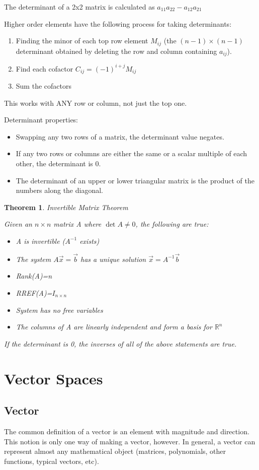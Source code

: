 \documentclass{article}
\newtheorem{theorem}{Theorem}
\begin{document}
The determinant of a 2x2 matrix is calculated as $a_{11}a_{22}-a_{12}a_{21}$

Higher order elements have the following process for taking determinants:
\begin{enumerate}
	\item Finding the minor of each top row element $M_{ij}$
		(the $(n-1)\times(n-1)$ determinant obtained by deleting the 
		row and column containing $a_{ij}$). 
	\item Find each cofactor $C_{ij}=(-1)^{i+j}M_{ij}$ 
	\item Sum the cofactors
\end{enumerate}
This works with ANY row or column, not just the top one.

Determinant properties:
\begin{itemize}
	\item Swapping any two rows of a matrix, the determinant value negates.
	\item If any two rows or columns are either the same or a scalar 
		multiple of each other, the determinant is 0.
	\item The determinant of an upper or lower triangular matrix is
		the product of the numbers along the diagonal.
\end{itemize}

\begin{theorem}Invertible Matrix Theorem

	Given an $n\times n$ matrix A where $\det{A}\neq0$, the following are 
	true:
	\begin{itemize}
		\item A is invertible ($A^{-1}$ exists)
		\item The system $A\vec{x}=\vec{b}$ has a unique solution 
			$\vec{x}=A^{-1}\vec{b}$
		\item Rank(A)=n
		\item RREF(A)=$I_{n\times n}$
		\item System has no free variables
		\item The columns of A are linearly independent and form a basis for $\mathbb{R}^n$
	\end{itemize}
	If the determinant is 0, the inverses of all of the above statements
	are true.
\end{theorem}

\section{Vector Spaces}
\subsection{Vector}
The common definition of a vector is an element with magnitude and direction. 
This notion is only one way of making a vector, however. In general, a vector
can represent almost any mathematical object (matrices, polynomials, other 
functions, typical vectors, etc).
\end{document}
